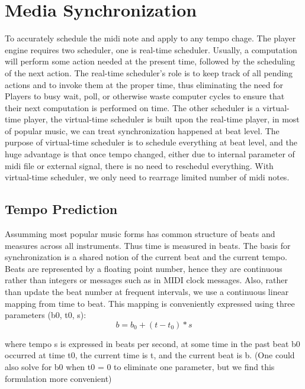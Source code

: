 \section{Media Synchronization}

To accurately schedule the midi note and apply to any tempo chage.  The player 
engine requires two scheduler, one is real-time scheduler. Usually, 
a computation will perform some action needed at the present time,
followed by the scheduling of the next action. The real-time scheduler’s role 
is to keep track of all pending actions and to invoke them at the proper 
time, thus eliminating the need
for Players to busy wait, poll, or otherwise waste computer cycles to 
ensure that their next computation is performed on time. The other 
scheduler is 
a virtual-time player, the virtual-time scheduler is built upon the
real-time player, in most of popular music, we can treat 
synchronization happened at beat level. The purpose of virtual-time
scheduler is to schedule everything at beat level, and the huge 
advantage is that once tempo changed, either due to internal parameter 
of midi file or external signal, there is no need to reschedul 
everything. With virtual-time scheduler, we only need to rearrage
limited number of midi notes.

\subsection{Tempo Prediction}
Assumming most popular music forms has common structure of
beats and measures across all instruments. Thus time is measured in beats. 
The basis for synchronization is a shared notion of the current beat 
and the current tempo. Beats are represented by a floating point number, 
hence they are continuous rather than
integers or messages such as in MIDI clock messages. Also, rather than update the
beat number at frequent intervals, we use a continuous linear mapping from time to
beat. This mapping is conveniently expressed using three parameters (b0, t0, s):
\begin{equation}
b = b_0 + (t - t_0) * s 
\end{equation}

where tempo s is expressed in beats per second, at some time in the past beat b0
occurred at time t0, the current time is t, and the current beat is b. (One could also
solve for b0 when t0 = 0 to eliminate one parameter, but we find this formulation
more convenient)

